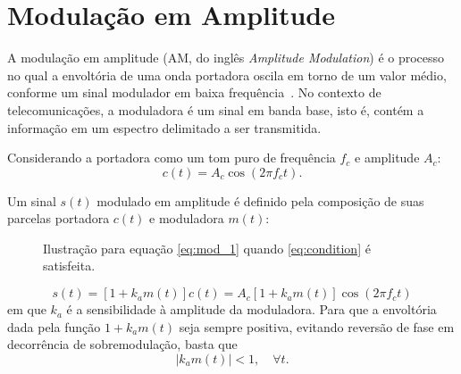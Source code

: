 \section{Modulação em Amplitude}
A modulação em amplitude (AM, do inglês
\textit{Amplitude Modulation}) é o processo no qual a envoltória de uma onda
portadora oscila em torno de um valor médio, conforme um sinal modulador em
baixa frequência~\cite{haykin2008}. No contexto de telecomunicações, a
moduladora é um sinal em banda base, isto é, contém a informação em um espectro
delimitado a ser transmitida.

Considerando a portadora como um tom puro de frequência $f_c$ e amplitude $A_c$:
\begin{equation}
    c(t) = A_c \cos(2\pi f_c t).
\end{equation}

    Um sinal $s(t)$ modulado em amplitude é definido pela composição de suas
parcelas portadora $c(t)$ e moduladora $m(t)$:
\begin{figure}[H]
    \centering
    \resizebox{1.0\textwidth}{!}{}
    \caption{Ilustração para equação \eqref{eq:mod_1} quando \eqref{eq:condition} é satisfeita.}
\end{figure}
\begin{equation}\label{eq:mod_1}
    s(t) = [1+k_a m(t)]c(t) = A_c[1+k_a m(t)]\cos(2\pi f_c t)
\end{equation}
em que $k_a$ é a sensibilidade à amplitude da moduladora. Para que a envoltória
dada pela função $1+k_a m(t)$ seja sempre positiva, evitando reversão de fase em
decorrência de sobremodulação, basta que
\begin{equation}\label{eq:condition}
    |k_a m(t)| < 1, \quad \forall t.
\end{equation}


